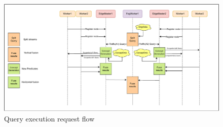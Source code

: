 \documentclass[5p,times]{elsarticle}
\begin{document}
\begin{figure}[t] %
  \centering
  \includegraphics[width=\columnwidth]{Communication_new.drawio.pdf}
  \caption{Query execution request flow}
  \label{fig:queryexe}
\end{figure}








    
\end{document}
